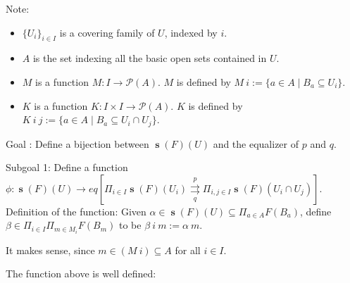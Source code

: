 \documentclass[a4paper]{article}
\title{\hmwkTitle}
\author{\textbf{\hmwkAuthorName}}
\date{\hmwkDueDate}
\DeclareMathOperator{\s}{\mathbf s}
\begin{document}
\begin{titlepage}
    \maketitle
\end{titlepage}

\begin{center}
\end{center}

Note:
\begin{itemize}
\item $\{U_i\}_{i\in I}$ is a covering family of $U$, indexed by $i$.
\item $A$ is the set indexing all the basic open sets contained in $U$. 
\item $M$ is a function $M: I\to {\mathcal P}(A)$. $M$ is defined by $M \ i := \{a\in A\mid B_a\subseteq U_i\}$.
\item $K$ is a function $K:I\times I \to {\mathcal P}(A)$. $K$ is defined by $K \ i \ j := \{a\in A\mid B_a\subseteq U_i\cap U_j\}$.
\end{itemize}

Goal : Define a bijection between $\s(F)(U)$ and the equalizer of $p$ and $q$.

Subgoal 1: Define a function $\phi:\s(F)(U)\to eq[\Pi_{i\in I}\s(F)(U_i)\overset{p}{\underset{q}\rightrightarrows}\Pi_{i,j\in I}\s(F)(U_i\cap U_j)]$. \newline
Definition of the function:\newline
Given $\alpha\in \s(F)(U)\subseteq \Pi_{a\in A}F(B_a)$, define $\beta\in \Pi_{i\in I}\Pi_{m\in M_i}F(B_m)$ to be $\beta \ i \ m := \alpha \ m$.

It makes sense, since $m\in (M \ i)\subseteq A$ for all $i\in I$.

The function above is well defined:\newline
\end{document}
